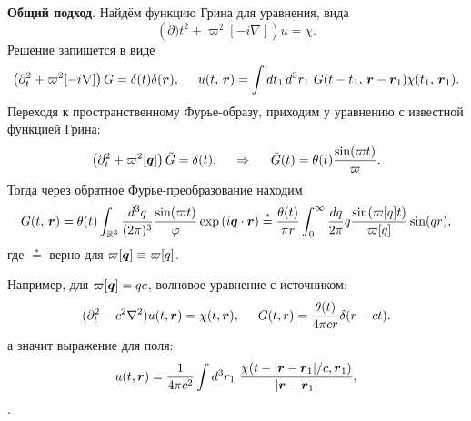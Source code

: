 


\textbf{Общий подход}. Найдём функцию Грина для уравнения, вида
\begin{equation*}
    \left(\partial)t^2 + \varpi^2[-i \nabla]\right) u = \chi.
\end{equation*}
Решение запишется в виде
\begin{equation*}
    \left(
        \partial_t^2 + \varpi^2[-i \nabla]
    \right) G = \delta(t) \delta(\vc{r}),
    \hspace{5 mm} 
    u(t,\, \vc{r}) = \int dt_1\, d^3 r_1\ 
    G(t-t_1,\, \vc{r}- \vc{r}_1) \chi(t_1,\, \vc{r}_1).
\end{equation*}
Переходя к пространственному Фурье-образу, приходим у уравнению с известной функцией Грина:
\begin{equation*}
    \left(\partial_t^2 + \varpi^2[\mbox{\boldmath $q$}]\right) \tilde{G} = \delta(t),
    \hspace{0.5cm} \Rightarrow \hspace{0.5cm}   
    \tilde{G}(t) = \theta(t) \frac{\sin(\varpi t)}{\varpi}.
\end{equation*}
Тогда через обратное Фурье-преобразование находим
\begin{equation*}
    G(t,\, \mbox{\boldmath $r$}) = \theta(t) \int_{\mathbb{R}^3} \frac{d^3 q}{(2\pi)^3} \frac{\sin(\varpi t)}{\varphi} \exp\left(i \mbox{\boldmath $q$} \cdot \mbox{\boldmath $r$}\right) \overset{*}{=} 
    \frac{\theta(t)}{\pi r} \int_{0}^{\infty}  \frac{dq}{2\pi} q \frac{\sin(\varpi[q] t)}{\varpi[q]} \sin(qr)
    ,
\end{equation*}
где $\overset{*}{=}$ верно для $\varpi[\mbox{\boldmath $q$}] \equiv \varpi[q]$. 



Например, для $\varpi[\mbox{\boldmath $q$}] = qc$, волновое уравнение с источником:
\begin{equation}
    (\partial_t^2 - c^2 \nabla^2) u(t, \mbox{\boldmath $r$}) = \chi(t, \mbox{\boldmath $r$}),
    \hspace{5 mm} 
    G(t, r) = \frac{\theta(t)}{4 \pi c r} \delta(r - ct).
\end{equation}
а значит выражение для поля:
\begin{equation}
    u(t, \mbox{\boldmath $r$}) = \frac{1}{4 \pi c^2} \int d^3 r_1 \ \frac{\chi(t-|\mbox{\boldmath $r$} - \mbox{\boldmath $r$}_1|/c, \mbox{\boldmath $r$}_1)}{|\mbox{\boldmath $r$} - \mbox{\boldmath $r$}_1|},
\end{equation}
.





